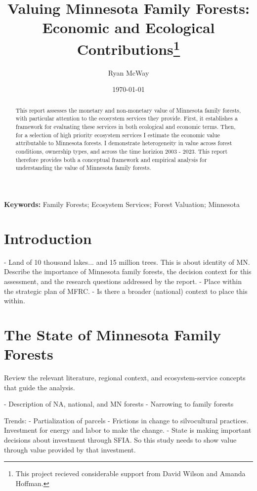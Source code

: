 \documentclass[11pt]{article}
\title{\bf{Valuing Minnesota Family Forests: \\ Economic and Ecological Contributions\thanks{
	This project recieved considerable support from David Wilson and Amanda Hoffman.
}}}
\author{Ryan McWay}
\date{\today}
\begin{document}
\maketitle

\begin{abstract}
This report assesses the monetary and non-monetary value of Minnesota family forests, with particular attention to the ecosystem services they provide. First, it establishes a framework for evaluating these services in both ecological and economic terms. Then, for a selection of high priority ecosystem services I estimate the economic value attributable to Minnesota forests. I demonstrate heterogeneity in value across forest conditions, ownership types, and across the time horizion 2003 - 2023. This report therefore provides both a conceptual framework and empirical analysis for understanding the value of Minnesota family forests.
\end{abstract}

\noindent\textbf{Keywords:} Family Forests; Ecosystem Services; Forest Valuation; Minnesota

\clearpage 
\tableofcontents
\newpage

\section{Introduction}
- Land of 10 thousand lakes... and 15 million trees. This is about identity of MN. 
Describe the importance of Minnesota family forests, the decision context for this assessment, and the research questions addressed by the report.
- Place within the strategic plan of MFRC. 
- Is there a broader (national) context to place this within.

\section{The State of Minnesota Family Forests}
Review the relevant literature, regional context, and ecosystem-service concepts that guide the analysis.

- Description of NA, national, and MN forests 
- Narrowing to family forests


Trends: 
- Partialization of parcels
- Frictions in change to silvocultural practices. Investment for energy and labor to make the change. 
- State is making important decisions about investment through SFIA. So this study needs to show value through value provided by that investment. 
\end{document}
